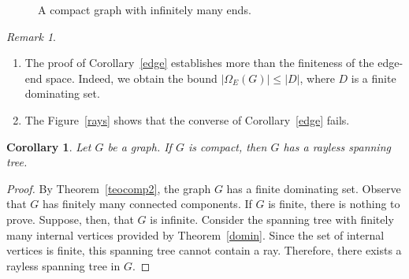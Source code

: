 \documentclass{amsart}
\newtheorem{corollary}{Corollary}[section]
\theoremstyle{definition}
\theoremstyle{remark}
\newtheorem{remark}{Remark}[section]
\numberwithin{equation}{section}
\begin{document}
\begin{figure}[h]

	
	\caption{A compact graph with infinitely many ends. }
		\label{exm}
\end{figure}
\begin{remark}
	\text{}
	\begin{enumerate}
\item 	The proof of Corollary~\ref{edge} establishes more than the finiteness of the edge-end space. Indeed, we obtain the bound $|\Omega_E(G)| \leq |D|$, where $D$ is a finite dominating set.
	
\item 	The Figure~\ref{rays} shows that the converse of Corollary~\ref{edge} fails.
\end{enumerate}
\end{remark}





\begin{corollary}
	Let $G$ be a graph. If $G$ is compact, then $G$ has a rayless spanning tree.
	\label{rayless}

	\end{corollary}
	
	\begin{proof}
By Theorem~\ref{teocomp2}, the graph $G$ has a finite dominating set. Observe that $G$ has finitely many connected components. If $G$ is finite, there is nothing to prove. Suppose, then, that $G$ is infinite. Consider the spanning tree with finitely many internal vertices provided by Theorem~\ref{domin}. Since the set of internal vertices is finite, this spanning tree cannot contain a ray. Therefore, there exists a rayless spanning tree in $G$.
	\end{proof}
	
\end{document}
